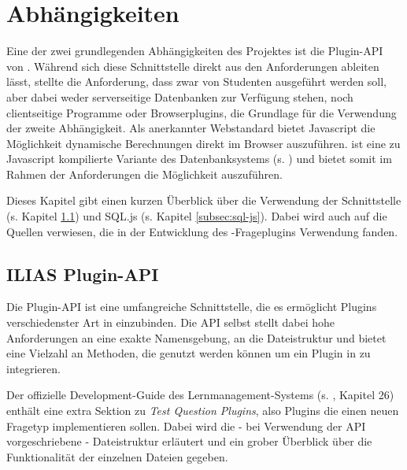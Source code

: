 \section{Abhängigkeiten}
\label{sec:schnittstellen}

Eine der zwei grundlegenden Abhängigkeiten des  Projektes ist die Plugin-API von . Während sich diese Schnittstelle direkt aus den Anforderungen ableiten lässt, stellte die Anforderung, dass  zwar von Studenten ausgeführt werden soll, aber dabei weder serverseitige Datenbanken zur Verfügung stehen, noch clientseitige Programme oder Browserplugins, die Grundlage für die Verwendung der zweite Abhängigkeit. Als anerkannter Webstandard bietet Javascript die Möglichkeit dynamische Berechnungen direkt im Browser auszuführen.  ist eine zu Javascript kompilierte Variante des Datenbanksystems  (s. \cite{SQLjs}) und bietet somit im Rahmen der Anforderungen die Möglichkeit  auszuführen.

Dieses Kapitel gibt einen kurzen Überblick über die Verwendung der  Schnittstelle (s. Kapitel \ref{subsec:ilias-plugin-api}) und SQL.js (s. Kapitel \ref{subsec:sql-js}). Dabei wird auch auf die Quellen verwiesen, die in der Entwicklung des -Frageplugins Verwendung fanden. 

\subsection{ILIAS Plugin-API}
\label{subsec:ilias-plugin-api}
    Die  Plugin-API ist eine umfangreiche Schnittstelle, die es ermöglicht Plugins verschiedenster Art in  einzubinden. Die API selbst stellt dabei hohe Anforderungen an eine exakte Namensgebung, an die Dateistruktur und bietet eine Vielzahl an Methoden, die genutzt werden können um ein Plugin in  zu integrieren. 
    
    Der offizielle Development-Guide des Lernmanagement-Systems  (s. \cite{IliasDevelopmentGuide}, Kapitel 26) enthält eine extra Sektion zu \glqq\textit{Test Question Plugins}\grqq , also Plugins die einen neuen Fragetyp implementieren sollen. Dabei wird die - bei Verwendung der API vorgeschriebene - Dateistruktur erläutert und ein grober Überblick über die Funktionalität der einzelnen Dateien gegeben.
    

